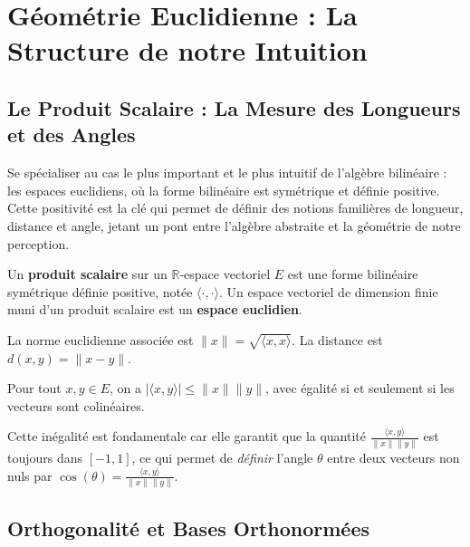 \chapter{Géométrie Euclidienne : La Structure de notre Intuition}

\section{Le Produit Scalaire : La Mesure des Longueurs et des Angles}

\begin{objectif}
    Se spécialiser au cas le plus important et le plus intuitif de l'algèbre bilinéaire : les espaces euclidiens, où la forme bilinéaire est symétrique et définie positive. Cette positivité est la clé qui permet de définir des notions familières de longueur, distance et angle, jetant un pont entre l'algèbre abstraite et la géométrie de notre perception.
\end{objectif}

\begin{definition}
    Un \textbf{produit scalaire} sur un $\mathbb{R}$-espace vectoriel $E$ est une forme bilinéaire symétrique définie positive, notée $\langle \cdot, \cdot \rangle$.
    Un espace vectoriel de dimension finie muni d'un produit scalaire est un \textbf{espace euclidien}.
\end{definition}

\begin{definition}
    La norme euclidienne associée est $\|x\| = \sqrt{\langle x, x \rangle}$. La distance est $d(x,y) = \|x-y\|$.
\end{definition}

\begin{theorem}
    Pour tout $x,y \in E$, on a $|\langle x, y \rangle| \le \|x\| \|y\|$, avec égalité si et seulement si les vecteurs sont colinéaires.
\end{theorem}
\begin{remark}
    Cette inégalité est fondamentale car elle garantit que la quantité $\frac{\langle x, y \rangle}{\|x\| \|y\|}$ est toujours dans $[-1, 1]$, ce qui permet de \textit{définir} l'angle $\theta$ entre deux vecteurs non nuls par $\cos(\theta) = \frac{\langle x, y \rangle}{\|x\| \|y\|}$.
\end{remark}

\section{Orthogonalité et Bases Orthonormées}

